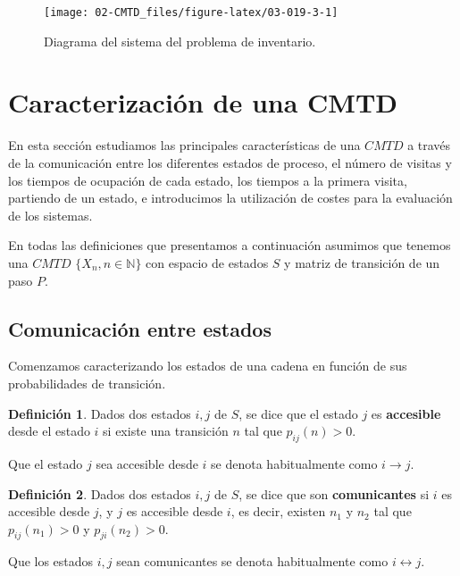\documentclass[
]{book}
\newenvironment{yellowbox}{
  \definecolor{shadecolor}{rgb}{210, 180, 140}  
  \color{black}
  \begin{shaded}}
 {\end{shaded}}
\theoremstyle{definition}
\newtheorem{definition}{Definición}[chapter]
\theoremstyle{definition}
\theoremstyle{definition}
\theoremstyle{definition}
\theoremstyle{remark}
\begin{document}
\begin{figure}

{\centering \texttt{[image: 02-CMTD\_files/figure-latex/03-019-3-1]} 

}

\caption{Diagrama del sistema del problema de inventario.}\label{fig:03-019-3}
\end{figure}

\hypertarget{CaracCMTD}{%
\section{Caracterización de una CMTD}\label{CaracCMTD}}

En esta sección estudiamos las principales características de una \(CMTD\) a través de la comunicación entre los diferentes estados de proceso, el número de visitas y los tiempos de ocupación de cada estado, los tiempos a la primera visita, partiendo de un estado, e introducimos la utilización de costes para la evaluación de los sistemas.

En todas las definiciones que presentamos a continuación asumimos que tenemos una \(CMTD\) \(\{X_n, n \in \mathbb{N}\}\) con espacio de estados \(S\) y matriz de transición de un paso \(P\).

\hypertarget{comunicaciuxf3n-entre-estados}{%
\subsection{Comunicación entre estados}\label{comunicaciuxf3n-entre-estados}}

Comenzamos caracterizando los estados de una cadena en función de sus probabilidades de transición.

\begin{yellowbox}

\begin{definition}
Dados dos estados \(i, j\) de \(S\), se dice que el estado \(j\) es \textbf{accesible} desde el estado \(i\) si existe una transición \(n\) tal que \(p_{ij}(n) > 0\).

Que el estado \(j\) sea accesible desde \(i\) se denota habitualmente como \(i \rightarrow j\).
\end{definition}

\end{yellowbox}

\begin{yellowbox}

\begin{definition}
Dados dos estados \(i, j\) de \(S\), se dice que son \textbf{comunicantes} si \(i\) es accesible desde \(j\), y \(j\) es accesible desde \(i\), es decir, existen \(n_1\) y \(n_2\) tal que \(p_{ij}(n_1) > 0\) y \(p_{ji}(n_2) > 0.\)

Que los estados \(i, j\) sean comunicantes se denota habitualmente como \(i \leftrightarrow j\).
\end{definition}

\end{yellowbox}
\end{document}
